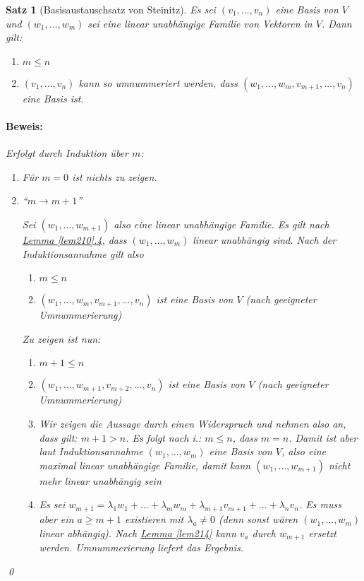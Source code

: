 \documentclass{report}
\newcommand{\IN}[1]{\index{#1|BH}}
\newcommand{\lb}{\lambda}
\theoremstyle{customrem}
\theoremstyle{customdef}
\newtheorem{satz}[definition]{Satz}
\renewenvironment{proof}{\paragraph{Beweis: }}{\qed}
\theoremstyle{customenv}
\begin{document}
	\begin{satz}[Basisaustauschsatz von Steinitz]
		\IN{Basisaustauschsatz}
		\label{satz215}
		Es sei \((v_1, \dots, v_n)\) eine Basis von \(V\) und \((w_1, \dots, w_m)\) sei eine linear unabhängige Familie von Vektoren in \(V\). Dann gilt:
		\begin{enumerate}
			\itemsep0cm
			\item \(m \leq n\)
			\item \((v_1, \dots, v_n)\) kann so umnummeriert werden, dass \((w_1, \ldots, w_m, v_{m + 1}, \ldots, v_n)\) eine Basis ist.
		\end{enumerate}
		
		\begin{proof} Erfolgt durch Induktion über \(m\):
			\begin{enumerate}
				\item[IA:] Für \(m = 0\) ist nichts zu zeigen.
				\item[IS:] "`\(m \to m + 1\)"'
				
				Sei \((w_1, \dots, w_{m+1})\) also eine linear unabhängige Familie. Es gilt nach \hyperref[lem210]{Lemma \ref*{lem210}.4}, dass \((w_1, \dots, w_m)\) linear unabhängig sind. Nach der Induktionsannahme gilt also
				
				\begin{enumerate}
					\item[i.]  \(m \leq n\)
					\item[ii.] \((w_1, \dots, w_m, v_{m+1}, \dots, v_n)\) ist eine Basis von \(V\) (nach geeigneter Umnummerierung)
				\end{enumerate}
				
				Zu zeigen ist nun:
				
				\begin{enumerate}
					\item[a) ] \(m+1\leq n\)
					\item[b) ] \((w_1, \dots, w_{m+1}, v_{m+2}, \dots, v_n)\) ist eine Basis von \(V\) (nach geeigneter Umnummerierung)\vspace{.2cm}
					\item[Zu a):] Wir zeigen die Aussage durch einen Widerspruch und nehmen also an, dass gilt: \(m+1>n\). Es folgt nach i.: \(m\leq n\), dass \(m=n\). Damit ist aber laut Induktionsannahme \((w_1,\ldots, w_m)\) eine Basis von \(V\), also eine maximal linear unabhängige Familie, damit kann \((w_1, \ldots, w_{m+1})\) nicht mehr linear unabhängig sein \Lightning
					\item[Zu b):] Es sei \(w_{m+1} = \lb_1w_1+\ldots+\lb_m w_m + \lb_{m+1} v_{m+1} +\ldots + \lb_n v_n\). Es muss aber ein \(a\geq m+1\) existieren mit \(\lb_a\not=0\) (denn sonst wären \((w_1, \ldots, w_m)\) linear abhängig). Nach \hyperref[lem214]{Lemma \ref*{lem214}} kann \(v_a\) durch \(w_{m+1}\) ersetzt werden. Umnummerierung liefert das Ergebnis.
				\end{enumerate}
			\end{enumerate}
		\end{proof}
	\end{satz}
	
\end{document}
